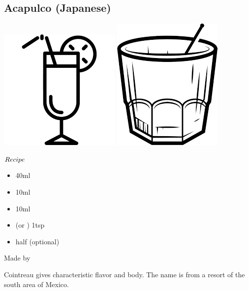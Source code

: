 \subsection{Acapulco (Japanese)}
\vspace{-7.5mm}
\hspace{54mm}
\includegraphics[scale=.07]{cocktail_glass_tall.png}
\includegraphics[scale=.06]{cocktail_glass_rock.png}
\vspace{2.5mm}
\begin{itembox}[l]{\boldmath $Recipe$}
\begin{itemize}
\setlength{\parskip}{0cm}
\setlength{\itemsep}{0cm}
\item \rum 40ml
\item \cointreau 10ml
\item \lj 10ml
\item \sugar (or \gumsyrup) 1tsp
\item \ew half (optional)
\end{itemize}
\vspace{-4mm}
Made by \shake
\end{itembox}
Cointreau gives characteristic flavor and body.
The name is from a resort of the south area of Mexico.
